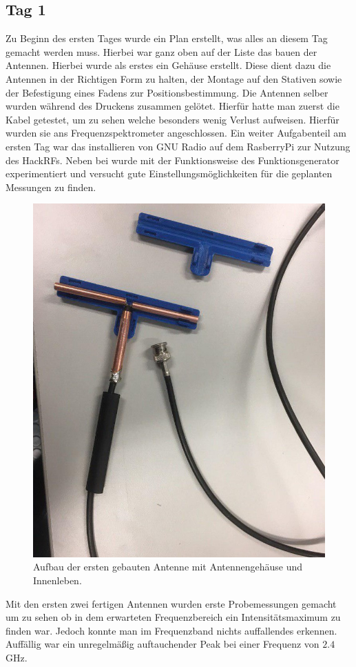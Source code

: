 \documentclass[titlepage,11pt,a4paper,ngerman]{article}
\begin{document}
\subsection{Tag 1}
Zu Beginn des ersten Tages wurde ein Plan erstellt, was alles an diesem Tag gemacht werden muss. Hierbei war ganz oben auf der Liste das bauen der Antennen. Hierbei wurde als erstes ein Gehäuse erstellt. Diese dient dazu die Antennen in der Richtigen Form zu halten, der Montage auf den Stativen sowie der Befestigung eines Fadens zur Positionsbestimmung. Die Antennen selber wurden während des Druckens zusammen gelötet. Hierfür hatte man zuerst die Kabel getestet, um zu sehen welche besonders wenig Verlust aufweisen. Hierfür wurden sie ans Frequenzspektrometer angeschlossen. 
Ein weiter Aufgabenteil am ersten Tag war das installieren von GNU Radio auf dem RasberryPi zur Nutzung des HackRFs. Neben bei wurde mit der Funktionsweise des Funktionsgenerator experimentiert und versucht gute Einstellungsmöglichkeiten für die geplanten Messungen zu finden.
\begin{figure}[h]
	\includegraphics[scale=0.25]{Bilder/Ant_innen_1}
	\centering
	\caption{Aufbau der ersten gebauten Antenne mit Antennengehäuse und Innenleben.}
\end{figure}
Mit den ersten zwei fertigen Antennen wurden erste Probemessungen gemacht um zu sehen ob in dem erwarteten Frequenzbereich ein Intensitätsmaximum zu finden war. Jedoch konnte man im Frequenzband nichts auffallendes erkennen. Auffällig war ein unregelmäßig auftauchender Peak bei einer Frequenz von $2.4\,$GHz. 
\end{document}
